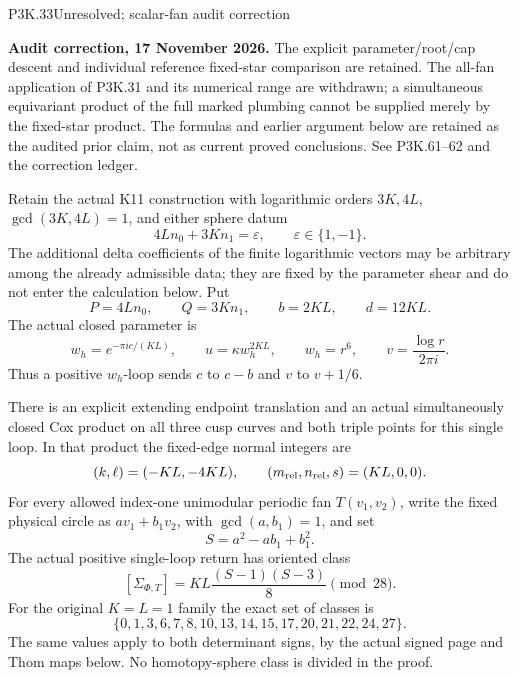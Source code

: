 \begin{statement}{P3K.33}{Unresolved; scalar-fan audit correction}
\par\noindent\textbf{Audit correction, 17 November 2026.} The explicit parameter/root/cap descent and individual reference fixed-star comparison are retained. The all-fan application of P3K.31 and its numerical range are withdrawn; a simultaneous equivariant product of the full marked plumbing cannot be supplied merely by the fixed-star product. The formulas and earlier argument below are retained as the audited prior claim, not as current proved conclusions. See P3K.61--62 and the correction ledger.
\medskip

Retain the actual K11 construction with logarithmic orders \(3K,4L\),
\(\gcd(3K,4L)=1\), and either sphere datum
\[
       4Ln_0+3Kn_1=\varepsilon,\qquad \varepsilon\in\{1,-1\}.
\]
The additional delta coefficients of the finite logarithmic vectors may
be arbitrary among the already admissible data; they are fixed by the
parameter shear and do not enter the calculation below. Put
\[
 P=4Ln_0,\qquad Q=3Kn_1,\qquad b=2KL,\qquad d=12KL.
\]
The actual closed parameter is
\[
 w_h=e^{-\pi i c/(KL)},\qquad u=\kappa w_h^{2KL},
 \qquad w_h=r^6,\qquad v=\frac{\log r}{2\pi i}.
\]
Thus a positive \(w_h\)-loop sends \(c\) to \(c-b\) and
\(v\) to \(v+1/6\).

There is an explicit extending endpoint translation and an actual
simultaneously closed Cox product on all three cusp curves and both
triple points for this single loop. In that product the fixed-edge
normal integers are
\[
          (k,\ell)=(-KL,-4KL),\qquad
          (m_{\rm rel},n_{\rm rel},s)=(KL,0,0).
\]
For every allowed index-one unimodular periodic fan \(T(v_1,v_2)\),
write the fixed physical circle as \(a v_1+b_1v_2\), with
\(\gcd(a,b_1)=1\), and set
\[
                 S=a^2-ab_1+b_1^2.
\]
The actual positive single-loop return has oriented class
\[
       [\Sigma_{\Phi,T}]
          =KL\frac{(S-1)(S-3)}8\pmod {28}.                 \tag{P3K.33.1}
\]
For the original \(K=L=1\) family the exact set of classes is
\[
 \{0,1,3,6,7,8,10,13,14,15,17,20,21,22,24,27\}.
\]
The same values apply to both determinant signs, by the actual signed
page and Thom maps below. No homotopy-sphere class is divided in the proof.
\end{statement}
